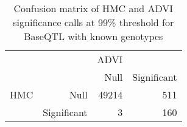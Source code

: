 \begin{table}[ht]
\centering
\caption{Confusion matrix of HMC and ADVI significance calls at 99\% threshold for BaseQTL with known genotypes} 
\label{tab:GT-xtab-99}
\begin{tabular}{rr|rr}
   &  & ADVI &  \\ 
    &   & Null & Significant \\ 
   \hline
HMC & Null & 49214 & 511 \\ 
    & Significant & 3 & 160 \\ 
  \end{tabular}
\end{table}
